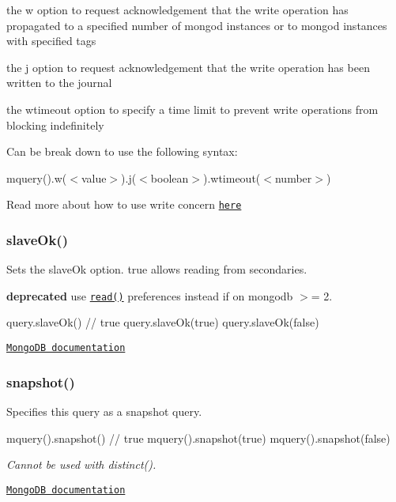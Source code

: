 \begin{DoxyItemize}
\item the w option to request acknowledgement that the write operation has propagated to a specified number of mongod instances or to mongod instances with specified tags
\item the j option to request acknowledgement that the write operation has been written to the journal
\item the wtimeout option to specify a time limit to prevent write operations from blocking indefinitely
\end{DoxyItemize}

Can be break down to use the following syntax\+:

mquery().w({\ttfamily $<$value$>$}).j({\ttfamily $<$boolean$>$}).wtimeout({\ttfamily $<$number$>$})

Read more about how to use write concern \href{https://docs.mongodb.com/manual/reference/write-concern/}{\tt here}

\subsubsection*{slave\+Ok()}

Sets the slave\+Ok option. {\ttfamily true} allows reading from secondaries.

{\bfseries deprecated} use \href{#read}{\tt read()} preferences instead if on mongodb $>$= 2.


\begin{DoxyCode}
query.slaveOk() // true
query.slaveOk(true)
query.slaveOk(false)
\end{DoxyCode}


\href{http://docs.mongodb.org/manual/reference/method/rs.slaveOk/}{\tt Mongo\+DB documentation}

\subsubsection*{snapshot()}

Specifies this query as a snapshot query.


\begin{DoxyCode}
mquery().snapshot() // true
mquery().snapshot(true)
mquery().snapshot(false)
\end{DoxyCode}


{\itshape Cannot be used with {\ttfamily distinct()}.}

\href{http://docs.mongodb.org/manual/reference/operator/snapshot/}{\tt Mongo\+DB documentation}

